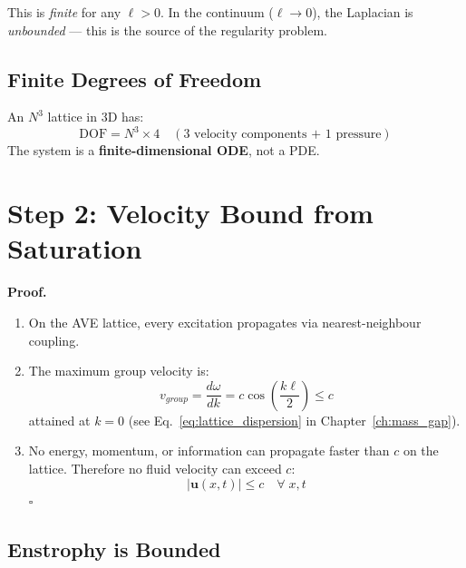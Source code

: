 This is \textit{finite} for any $\ell > 0$.  In the continuum
($\ell \to 0$), the Laplacian is \textit{unbounded} --- this is the
source of the regularity problem.

\subsection{Finite Degrees of Freedom}

An $N^3$ lattice in 3D has:
\begin{equation}
    \text{DOF} = N^3 \times 4
    \quad (\text{3 velocity components + 1 pressure})
\end{equation}
The system is a \textbf{finite-dimensional ODE}, not a PDE.

\section{Step 2: Velocity Bound from Saturation}
\label{sec:ns_velocity_bound}

\noindent{}

\medskip\noindent
\textbf{Proof.}
\begin{enumerate}
    \item On the AVE lattice, every excitation propagates via
    nearest-neighbour coupling.

    \item The maximum group velocity is:
    \begin{equation}
        v_{group} = \frac{d\omega}{dk}
        = c\cos\!\left(\frac{k\ell}{2}\right)
        \le c
    \end{equation}
    attained at $k = 0$ (see Eq.~\ref{eq:lattice_dispersion} in
    Chapter~\ref{ch:mass_gap}).

    \item No energy, momentum, or information can propagate faster
    than $c$ on the lattice.  Therefore no fluid velocity can exceed $c$:
    \begin{equation}
        \boxed{|\mathbf{u}(x,t)| \le c \quad \forall\; x, t}
    \end{equation}
    \hfill$\square$
\end{enumerate}

\subsection{Enstrophy is Bounded}

